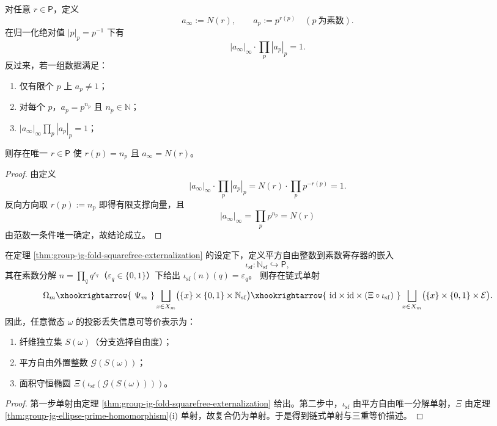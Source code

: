 \begin{proposition}\label{prop:group-jg-norm-one-idele-coherence}
对任意 \(r\in\mathsf P\)，定义
\[
a_\infty:=N(r),\qquad a_p:=p^{r(p)}\quad (p\ \text{为素数}).
\]
在归一化绝对值 \(|p|_p=p^{-1}\) 下有
\[
|a_\infty|_\infty\cdot\prod_{p}|a_p|_p=1.
\]
反过来，若一组数据满足：
\begin{enumerate}
  \item 仅有限个 \(p\) 上 \(a_p\neq 1\)；
  \item 对每个 \(p\)，\(a_p=p^{n_p}\) 且 \(n_p\in\mathbb N\)；
  \item \(|a_\infty|_\infty\prod_p|a_p|_p=1\)；
\end{enumerate}
则存在唯一 \(r\in\mathsf P\) 使 \(r(p)=n_p\) 且 \(a_\infty=N(r)\)。
\end{proposition}
\begin{proof}
由定义
\[
|a_\infty|_\infty\cdot\prod_p|a_p|_p
=N(r)\cdot\prod_p p^{-r(p)}
=1.
\]
反向方向取 \(r(p):=n_p\) 即得有限支撑向量，且
\[
|a_\infty|_\infty
=\prod_p p^{n_p}
=N(r)
\]
由范数一条件唯一确定，故结论成立。
\end{proof}

\begin{corollary}\label{cor:group-jg-fold-prime-ellipse-triple}
在定理 \ref{thm:group-jg-fold-squarefree-externalization} 的设定下，定义平方自由整数到素数寄存器的嵌入
\[
\iota_{\mathrm{sf}}:\mathbb N_{\mathrm{sf}}\hookrightarrow \mathsf P,
\]
其在素数分解 \(n=\prod_q q^{\varepsilon_q}\)（\(\varepsilon_q\in\{0,1\}\)）下给出 \( \iota_{\mathrm{sf}}(n)(q)=\varepsilon_q\)。
则存在链式单射
\[
\Omega_m
\xhookrightarrow{\ \Psi_m\ }
\bigsqcup_{x\in X_m}\bigl(\{x\}\times\{0,1\}\times \mathbb N_{\mathrm{sf}}\bigr)
\xhookrightarrow{\ \mathrm{id}\times\mathrm{id}\times (\Xi\circ\iota_{\mathrm{sf}})\ }
\bigsqcup_{x\in X_m}\bigl(\{x\}\times\{0,1\}\times \mathcal E\bigr).
\]
因此，任意微态 \(\omega\) 的投影丢失信息可等价表示为：
\begin{enumerate}
  \item 纤维独立集 \(S(\omega)\)（分支选择自由度）；
  \item 平方自由外置整数 \(\mathcal G(S(\omega))\)；
  \item 面积守恒椭圆 \(\Xi(\iota_{\mathrm{sf}}(\mathcal G(S(\omega))))\)。
\end{enumerate}
\end{corollary}
\begin{proof}
第一步单射由定理 \ref{thm:group-jg-fold-squarefree-externalization} 给出。第二步中，\(\iota_{\mathrm{sf}}\) 由平方自由唯一分解单射，\(\Xi\) 由定理 \ref{thm:group-jg-ellipse-prime-homomorphism}(i) 单射，故复合仍为单射。于是得到链式单射与三重等价描述。
\end{proof}

